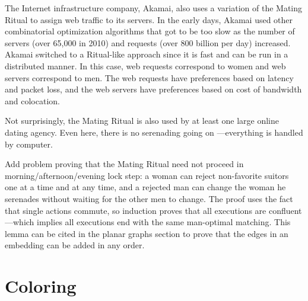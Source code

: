The Internet infrastructure company, Akamai, also uses a variation of
the Mating Ritual to assign web traffic to its servers.  In the early
days, Akamai used other combinatorial optimization algorithms that got
to be too slow as the number of servers (over 65,000 in 2010) and
requests (over 800 billion per day) increased.  Akamai switched to a
Ritual-like approach since it is fast and can be run in a distributed
manner.  In this case, web requests correspond to women and web
servers correspond to men.  The web requests have preferences based on
latency and packet loss, and the web servers have preferences based on
cost of bandwidth and colocation.

Not surprisingly, the Mating Ritual is also used by at least one large
online dating agency.  Even here, there is no serenading going
on ---everything is handled by computer.

\begin{problems}

\practiceproblems
{}

\classproblems

\homeworkproblems
{}


\begin{editingnotes}
\begin{problem*}
Add problem proving that the Mating Ritual need not proceed in
morning/afternoon/evening lock step: a woman can reject non-favorite
suitors one at a time and at any time, and a rejected man can change
the woman he serenades without waiting for the other men to change.
The proof uses the fact that single actions commute, so induction
proves that all executions are confluent ---which implies all
executions end with the same man-optimal matching.  This lemma can be
cited in the planar graphs section to prove that the edges in an
embedding can be added in any order.
\end{problem*}
\end{editingnotes}

\end{problems}


\section{Coloring}\label{sec:coloring}

